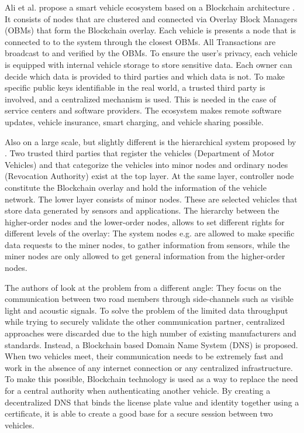 Ali et al. propose a smart vehicle ecosystem based on a Blockchain architecture \cite{DorriSteger2017}. It consists of nodes that are clustered and connected via Overlay Block Managers (OBMs) that form the Blockchain overlay. Each vehicle is presents a node that is connected to to the system through the closest OBMs. All Transactions are broadcast to and verified by the OBMs.
To ensure the user's privacy, each vehicle is equipped with internal vehicle storage to store sensitive data. Each owner can decide which data is provided to third parties and which data is not.
To make specific public keys identifiable in the real world, a trusted third party is involved, and a centralized mechanism is used. This is needed in the case of service centers and software providers. The ecosystem makes remote software updates, vehicle insurance, smart charging, and vehicle sharing possible.

Also on a large scale, but slightly different is the hierarchical system proposed by \cite{Sharma2017}. Two trusted third parties that register the vehicles (Department of Motor Vehicles) and that categorize the vehicles into minor nodes and ordinary nodes (Revocation Authority) exist at the top layer. At the same layer, controller node constitute the Blockchain overlay and hold the information of the vehicle network. The lower layer consists of minor nodes. These are selected vehicles that store data generated by sensors and applications. 
The hierarchy between the higher-order nodes and the lower-order nodes, allows to set different rights for different levels of the overlay: The system nodes e.g. are allowed to make specific data requests to the miner nodes, to gather information from sensors, while the miner nodes are only allowed to get general information from the higher-order nodes.

The authors of \cite{Rowan2017} look at the problem from a different angle: They focus on the communication between two road members through side-channels such as visible light and acoustic signals. To solve the problem of the limited data throughput while trying to securely validate the other communication partner, centralized approaches were discarded due to the high number of existing manufacturers and standards. Instead, a Blockchain based Domain Name System (DNS) is proposed.
When two vehicles meet, their communication needs to be extremely fast and work in the absence of any internet connection or any centralized infrastructure. 
To make this possible, Blockchain technology is used as a way to replace the need for a central authority when authenticating another vehicle. By creating a decentralized DNS that binds the license plate value and identity together using a certificate, it is able to create a good base for a secure session between two vehicles.

